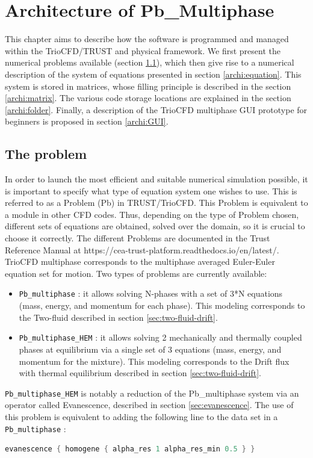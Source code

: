 \chapter{Architecture of Pb\_Multiphase}
This chapter aims to describe how the software is programmed and managed within the TrioCFD/TRUST and physical framework. We first present the numerical problems available (section \ref{archi:problem}), which then give rise to a numerical description of the system of equations presented in section \ref{archi:equation}. This system is stored in matrices, whose filling principle is described in the section \ref{archi:matrix}. The various code storage locations are explained in the section \ref{archi:folder}. Finally, a description of the TrioCFD multiphase GUI prototype for beginners is proposed in section \ref{archi:GUI}.
\section{The problem}\label{archi:problem}
In order to launch the most efficient and suitable numerical simulation possible, it is important to specify what type of equation system one wishes to use. This is referred to as a Problem (Pb) in TRUST/TrioCFD. This Problem is equivalent to a module in other CFD codes. Thus, depending on the type of Problem chosen, different sets of equations are obtained, solved over the domain, so it is crucial to choose it correctly. The different Problems are documented in the Trust Reference Manual at https://cea-trust-platform.readthedocs.io/en/latest/.\\
TrioCFD multiphase corresponds to the multiphase averaged Euler-Euler equation set for motion. Two types of problems are currently available:
\begin{itemize}
\item[\small \textcolor{blue}{\ding{109}}] \texttt{Pb_multiphase} : it allows solving N-phases with a set of 3*N equations (mass, energy, and momentum for each phase). This modeling corresponds to the Two-fluid described in section \ref{sec:two-fluid-drift}. 
\item[\small \textcolor{blue}{\ding{109}}] \texttt{Pb_multiphase_HEM} : it allows solving 2 mechanically and thermally coupled phases at equilibrium via a single set of 3 equations (mass, energy, and momentum for the mixture). This modeling corresponds to the Drift flux with thermal equilibrium described in section \ref{sec:two-fluid-drift}.
\end{itemize}
\texttt{Pb_multiphase_HEM} is notably a reduction of the Pb_multiphase system via an operator called Evanescence, described in section \ref{sec:evanescence}. The use of this problem is equivalent to adding the following line to the data set in a \texttt{Pb_multiphase} :
\begin{lstlisting}[language=c++]
evanescence { homogene { alpha_res 1 alpha_res_min 0.5 } }
\end{lstlisting}
